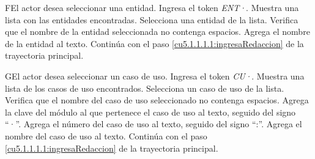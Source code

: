  \begin{UCtrayectoriaA}{F}{El actor desea seleccionar una entidad.}
 	\UCpaso[\UCactor] Ingresa el token {\it ENT·}.	
 	\UCpaso[\UCsist] Muestra una lista con las entidades encontradas.
 	\UCpaso[\UCactor] Selecciona una entidad de la lista.
  	\UCpaso[\UCsist] Verifica que el nombre de la entidad seleccionada no contenga espacios. 
  	\UCpaso[\UCsist] Agrega el nombre de la entidad al texto.
    \UCpaso[] Continúa con el paso \ref{cu5.1.1.1.1:ingresaRedaccion} de la trayectoria principal.
 \end{UCtrayectoriaA}
 \begin{UCtrayectoriaA}{G}{El actor desea seleccionar un caso de uso.}
 	\UCpaso[\UCactor] Ingresa el token {\it CU·}.
  	\UCpaso[\UCsist] Muestra una lista de los casos de uso encontrados.
 	\UCpaso[\UCactor] Selecciona un caso de uso de la lista.
  	\UCpaso[\UCsist] Verifica que el nombre del caso de uso seleccionado no contenga espacios. 
  	\UCpaso[\UCsist] Agrega la clave del módulo al que pertenece el caso de uso al texto, seguido del signo ``·''.
  	\UCpaso[\UCsist] Agrega el número del caso de uso al texto, seguido del signo ``:''.
  	\UCpaso[\UCsist] Agrega el nombre del caso de uso al texto.
    \UCpaso[] Continúa con el paso \ref{cu5.1.1.1.1:ingresaRedaccion} de la trayectoria principal.
 \end{UCtrayectoriaA}
 
